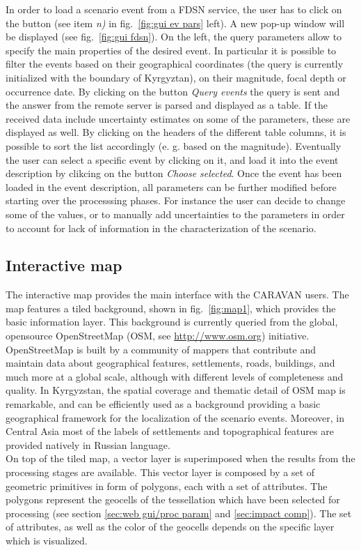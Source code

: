 \documentclass[12p]{article}
\begin{document}
In order to load a scenario event from a FDSN service, the user has to click on
the button (see item \emph{n)} in fig.~\ref{fig:gui ev pars} left). A new pop-up
window will be displayed (see fig.~\ref{fig:gui fdsn}). On the left, the query
parameters allow to specify the main properties of the desired event. In
particular it is possible to filter the events based on their geographical
coordinates (the query is currently initialized with the boundary of Kyrgyztan),
on their magnitude, focal depth or occurrence date. By clicking on the button
\emph{Query events} the query is sent and the answer from the remote server is
parsed and displayed as a table. If the received data include uncertainty
estimates on some of the parameters, these are displayed as well.
By clicking on the headers of the different table columns, it is possible to
sort the list accordingly (e. g. based on the magnitude). 
Eventually the user can select a specific event by clicking on it, and load it
into the event description by clikcing on the button \emph{Choose selected}. 
Once the event has been loaded in the event description, all parameters can be
further modified before starting over the processsing phases. For instance the
user can decide to change some of the values, or to manually add uncertainties
to the parameters in order to account for lack of information in the
characterization of the scenario.


\subsection{Interactive map}
\label{sec:web gui/map}

The interactive map provides the main interface with the CARAVAN users. The map
features a tiled background, shown in fig.~\ref{fig:map1}, which provides the
basic information layer. This background is currently queried from the global,
opensource OpenStreetMap (OSM, see \url{http://www.osm.org}) initiative.
OpenStreetMap is built by a community of mappers that contribute and maintain
data about geographical features, settlements, roads, buildings, and much more
at a global scale, although with different levels of completeness and quality.
In Kyrgyzstan, the spatial coverage and thematic detail of OSM map is
remarkable, and can be efficiently used as a background providing a basic
geographical framework for the localization of the scenario events. Moreover, in
Central Asia most of the labels of settlements and topographical features are
provided natively in Russian language.
\\
On top of the tiled map, a vector layer is superimposed when the results from
the processing stages are available. This vector layer is composed by a set of
geometric primitives in form of polygons, each with a set of attributes. The
polygons represent the geocells of the tessellation which have been selected for
processing (see section \ref{sec:web gui/proc param} and \ref{sec:impact
comp}). 
The set of attributes, as well as the color of the geocells depends on the
specific layer which is visualized.   
\end{document}
